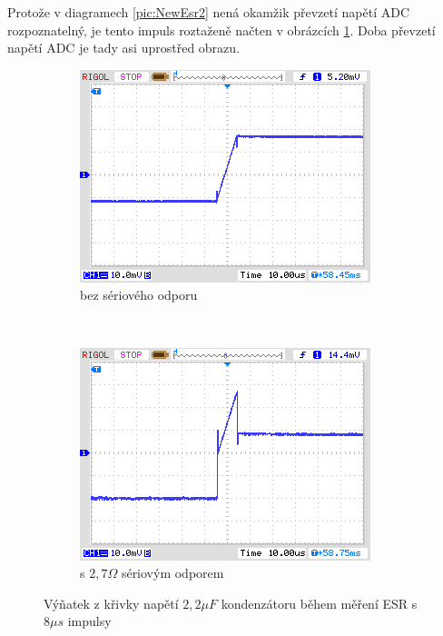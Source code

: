 Protože v diagramech \ref{pic:NewEsr2} nená okamžik převzetí napětí ADC rozpoznatelný,
je tento impuls roztaženě načten v obrázcích \ref{pic:NewEsr2zoom}.
Doba převzetí napětí ADC je tady asi uprostřed obrazu.

\begin{figure}[H]
  \begin{subfigure}[b]{.5\textwidth}
    \centering
    \includegraphics[width=1.\textwidth]{../PNG/NewEsr2u2F0R0zoom.png}
    \caption{bez sériového odporu}
  \end{subfigure}
  ~
  \begin{subfigure}[b]{.5\textwidth}
    \centering
    \includegraphics[width=1.\textwidth]{../PNG/NewEsr2u2F2R7zoom.png}
    \caption{s \(2,7\Omega\) sériovým odporem}
  \end{subfigure}
  \caption{Výňatek z křivky napětí \(2,2\mu F\) kondenzátoru během měření ESR s \(8\mu s\) impulsy}
  \label{pic:NewEsr2zoom}
\end{figure}
 

